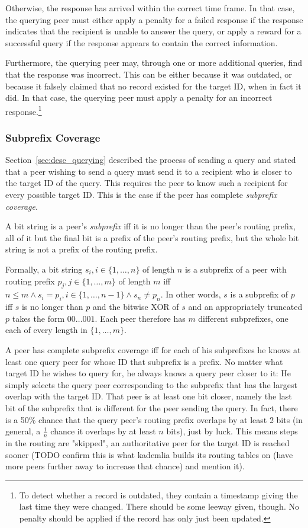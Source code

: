 Otherwise, the response has arrived within the correct time frame. In that case,
the querying peer must either apply a penalty for a failed response if the
response indicates that the recipient is unable to answer the query, or apply a
reward for a successful query if the response appears to contain the correct
information.

Furthermore, the querying peer may, through one or more additional queries, find
that the response was incorrect. This can be either because it was outdated, or
because it falsely claimed that no record existed for the target ID, when in
fact it did. In that case, the querying peer must apply a penalty for an
incorrect response.\footnote{To detect whether a record is outdated, they
contain a timestamp giving the last time they were changed. There should be some
leeway given, though. No penalty should be applied if the record has only just
been updated.}

\subsubsection{Subprefix Coverage}
Section~\ref{sec:desc_querying} described the process of sending a query and
stated that a peer wishing to send a query must send it to a recipient who is
closer to the target ID of the query. This requires the peer to know such a
recipient for every possible target ID. This is the case if the peer has
complete \emph{subprefix coverage}.

A bit string is a peer's \emph{subprefix} iff it is no longer than the peer's
routing prefix, all of it but the final bit is a prefix of the peer's routing
prefix, but the whole bit string is not a prefix of the routing prefix.

Formally, a bit string $s_i, i \in \{1, \ldots, n\}$ of length $n$ is a
subprefix of a peer with routing prefix $p_j, j \in \{1, \ldots, m\}$ of length
$m$ iff $n \leq m \land s_i = p_i, i \in \{1, \ldots, n - 1\} \land s_n \neq
p_n$. In other words, $s$ is a subprefix of $p$ iff $s$ is no longer than $p$
and the bitwise XOR of $s$ and an appropriately truncated $p$ takes the form
$00\ldots001$. Each peer therefore has $m$ different subprefixes, one each of
every length in $\{1, \ldots, m\}$.

A peer has complete subprefix coverage iff for each of his subprefixes he knows
at least one query peer for whose ID that subprefix is a prefix. No matter what
target ID he wishes to query for, he always knows a query peer closer to it: He
simply selects the query peer corresponding to the subprefix that has the
largest overlap with the target ID. That peer is at least one bit closer, namely
the last bit of the subprefix that is different for the peer sending the query.
In fact, there is a 50\% chance that the query peer's routing prefix overlaps by
at least 2 bits (in general, a $\frac{1}{n}$ chance it overlaps by at least $n$
bits), just by luck. This means steps in the routing are "skipped", an
authoritative peer for the target ID is reached sooner (TODO confirm this is
what kademlia builds its routing tables on (have more peers further away to
increase that chance) and mention it).

